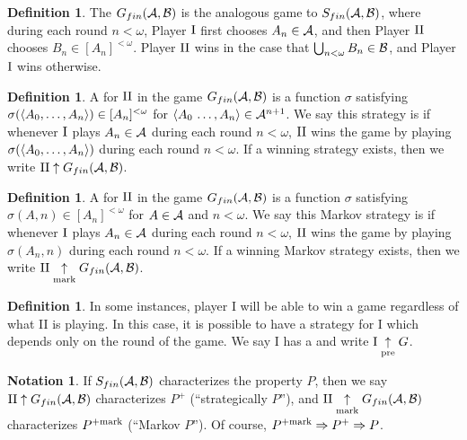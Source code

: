 \documentclass{amsart}
\theoremstyle{plain}
\theoremstyle{definition}
\newtheorem{definition}[theorem]{Definition}
\newtheorem{notation}[theorem]{Notation}
\theoremstyle{remark}
\theoremstyle{plain}
\theoremstyle{definition}
\theoremstyle{remark}
\begin{document}
\begin{definition}
 The  \(G_{fin}(\mathcal{A},\mathcal{B})\) is the analogous game to \(S_{fin}(\mathcal{A},\mathcal{B})\), where during each round \(n<\omega\), Player \(\mathrm{I}\) first chooses \(A_n\in\mathcal{A}\), and then Player \(\mathrm{II}\) chooses \(B_n\in[A_n]^{<\omega}\).
 Player \(\mathrm{II}\) wins in the case that \(\bigcup_{n<\omega}B_n\in\mathcal{B}\), and Player \(\mathrm{I}\) wins otherwise.
\end{definition}

\begin{definition}
  A  for \(\mathrm{II}\) in the game \(G_{fin}(\mathcal{A},\mathcal{B})\) is a function \(\sigma\) satisfying \(\sigma(\langle A_0,\dots,A_n\rangle)\in[A_n]^{<\omega}\) for \(\langle A_0\,\dots,A_n\rangle\in\mathcal{A}^{n+1}\).
  We say this strategy is  if whenever \(\mathrm{I}\) plays \(A_n\in\mathcal{A}\) during each round \(n<\omega\), \(\mathrm{II}\) wins the game by playing \(\sigma(\langle A_0,\dots,A_n\rangle)\) during each round \(n<\omega\).
  If a winning strategy exists, then we write \(\mathrm{II}\uparrow G_{fin}(\mathcal{A},\mathcal{B})\).
\end{definition}

\begin{definition}
  A  for \(\mathrm{II}\) in the game \(G_{fin}(\mathcal{A},\mathcal{B})\) is a function \(\sigma\) satisfying \(\sigma(A,n)\in[A_n]^{<\omega}\) for \(A\in\mathcal{A}\) and \(n<\omega\). We say this Markov strategy is  if whenever \(\mathrm{I}\) plays \(A_n\in\mathcal{A}\) during each round \(n<\omega\), \(\mathrm{II}\) wins the game by playing \(\sigma(A_n,n)\) during each round \(n<\omega\). 
  If a winning Markov strategy exists, then we write \(\mathrm{II}\underset{\text{mark}}{\uparrow}G_{fin}(\mathcal{A},\mathcal{B})\).
\end{definition}

\begin{definition}
 In some instances, player I will be able to win a game regardless of what II is playing.
 In this case, it is possible to have a strategy for I which depends only on the round of the game.
 We say I has a  and write \(\mathrm{I}\underset{\text{pre}}{\uparrow} G\).
\end{definition}

\begin{notation}
 If \(S_{fin}(\mathcal{A},\mathcal{B})\) characterizes the property \(P\), then we say \(\mathrm{II}\uparrow G_{fin}(\mathcal{A},\mathcal{B})\) characterizes \(P^+\) (``strategically \(P\)''), and \(\mathrm{II}\underset{\text{mark}}{\uparrow}G_{fin}(\mathcal{A},\mathcal{B})\) characterizes \(P^{+\mathrm{mark}}\) (``Markov \(P\)'').
 Of course, \(P^{+\mathrm{mark}}\Rightarrow P^+ \Rightarrow P\).
\end{notation}
\end{document}
